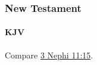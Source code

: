 	\subsubsection{New Testament} %
		\label{FAITH-NT}
	
		\paragraph{KJV}
			\label{FAITH-NT-KJV}
			
	
			
			\begin{compactdesc}
				\item[{\hyperref[JOHN-20-24]{John 20:24--29}}] \phantom{.}
					\begin{compactitem}
						\item Compare \hyperref[3NEPHI-11-15]{3 Nephi 11:15}.
					\end{compactitem}
				\item[{\hyperref[ROMANS-8-24]{Romans 8:24--25}}]
			\end{compactdesc}
			
		
			
				
		
